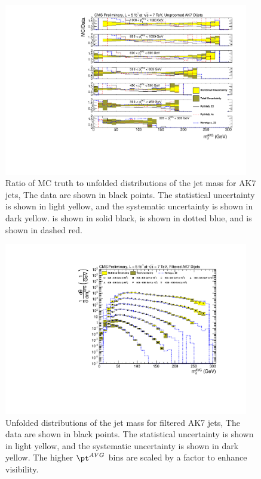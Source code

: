 \begin{figure}[htbp]
\centering
\includegraphics[width=0.95\textwidth]{figs/unfoldedMeasurementDijets_allfrac_}
\caption{Ratio of MC truth to unfolded distributions of the jet mass for AK7 jets,
The data are shown in black points.
The statistical uncertainty is shown in light yellow, and the
systematic uncertainty is shown in dark yellow. \PYTHIA is shown in solid black, \HERWIG is shown in dotted blue, and  is shown in dashed red.
\label{figs:unfoldedMeasurementDijets_allfrac}}
\end{figure}


\begin{figure}[htbp]
\centering
\includegraphics[width=0.95\textwidth]{figs/unfoldedMeasurementDijets_all__Filtered}
\caption{Unfolded distributions of the jet mass for filtered AK7 jets,
The data are shown in black points. 
The statistical uncertainty is shown in light yellow, and the
systematic uncertainty is shown in dark yellow.
The higher $\pt^{AVG}$ bins are scaled by a factor to
enhance visibility.
\label{figs:unfoldedMeasurementDijets_all_Filtered}}
\end{figure}

